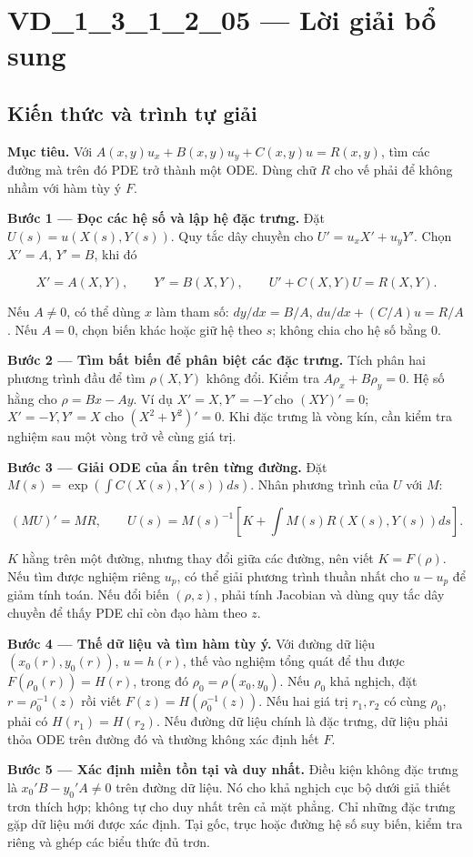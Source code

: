 \documentclass[10pt,a4paper]{article}
\begin{document}
\section*{VD\_1\_3\_1\_2\_05 — Lời giải bổ sung}
\subsection*{Kiến thức và trình tự giải}
\textbf{Mục tiêu.} Với $A(x,y)u_x+B(x,y)u_y+C(x,y)u=R(x,y)$, tìm các đường mà trên đó PDE trở thành một ODE. Dùng chữ $R$ cho vế phải để không nhầm với hàm tùy ý $F$.

\textbf{Bước 1 — Đọc các hệ số và lập hệ đặc trưng.} Đặt $U(s)=u(X(s),Y(s))$. Quy tắc dây chuyền cho $U'=u_xX'+u_yY'$. Chọn $X'=A$, $Y'=B$, khi đó

\[
X'=A(X,Y),\qquad Y'=B(X,Y),\qquad U'+C(X,Y)U=R(X,Y).
\]

Nếu $A\ne0$, có thể dùng $x$ làm tham số: $dy/dx=B/A$, $du/dx+(C/A)u=R/A$. Nếu $A=0$, chọn biến khác hoặc giữ hệ theo $s$; không chia cho hệ số bằng 0.

\textbf{Bước 2 — Tìm bất biến để phân biệt các đặc trưng.} Tích phân hai phương trình đầu để tìm $\rho(X,Y)$ không đổi. Kiểm tra $A\rho_x+B\rho_y=0$. Hệ số hằng cho $\rho=Bx-Ay$. Ví dụ $X'=X,Y'=-Y$ cho $(XY)'=0$; $X'=-Y,Y'=X$ cho $(X^2+Y^2)'=0$. Khi đặc trưng là vòng kín, cần kiểm tra nghiệm sau một vòng trở về cùng giá trị.

\textbf{Bước 3 — Giải ODE của ẩn trên từng đường.} Đặt $M(s)=\exp(\int C(X(s),Y(s))ds)$. Nhân phương trình của $U$ với $M$:

\[
(MU)'=MR,\qquad
U(s)=M(s)^{-1}\left[K+\int M(s)R(X(s),Y(s))ds\right].
\]

$K$ hằng trên một đường, nhưng thay đổi giữa các đường, nên viết $K=F(\rho)$. Nếu tìm được nghiệm riêng $u_p$, có thể giải phương trình thuần nhất cho $u-u_p$ để giảm tính toán. Nếu đổi biến $(\rho,z)$, phải tính Jacobian và dùng quy tắc dây chuyền để thấy PDE chỉ còn đạo hàm theo $z$.

\textbf{Bước 4 — Thế dữ liệu và tìm hàm tùy ý.} Với đường dữ liệu $(x_0(r),y_0(r))$, $u=h(r)$, thế vào nghiệm tổng quát để thu được $F(\rho_0(r))=H(r)$, trong đó $\rho_0=\rho(x_0,y_0)$. Nếu $\rho_0$ khả nghịch, đặt $r=\rho_0^{-1}(z)$ rồi viết $F(z)=H(\rho_0^{-1}(z))$. Nếu hai giá trị $r_1,r_2$ có cùng $\rho_0$, phải có $H(r_1)=H(r_2)$. Nếu đường dữ liệu chính là đặc trưng, dữ liệu phải thỏa ODE trên đường đó và thường không xác định hết $F$.

\textbf{Bước 5 — Xác định miền tồn tại và duy nhất.} Điều kiện không đặc trưng là $x_0'B-y_0'A\ne0$ trên đường dữ liệu. Nó cho khả nghịch cục bộ dưới giả thiết trơn thích hợp; không tự cho duy nhất trên cả mặt phẳng. Chỉ những đặc trưng gặp dữ liệu mới được xác định. Tại gốc, trục hoặc đường hệ số suy biến, kiểm tra riêng và ghép các biểu thức đủ trơn.
\end{document}
